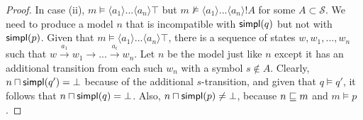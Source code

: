 \begin{proof}
In case (ii), $m \models \langle a_1 \rangle ... \langle a_n \rangle
\top$ but $m \nvDash \langle a_1 \rangle ... \langle a_n \rangle !A$
for some $A \subset \mathcal{S}$. We need to produce a model $n$ that
is incompatible with $\mathsf{simpl}(q)$ but not with $\mathsf{simpl}(p)$. Given that
$m \models \langle a_1 \rangle ... \langle a_n \rangle \top$, there is
a sequence of states $w, w_1, ..., w_n$ such that $w \xrightarrow{a_1}
w_1 \rightarrow ... \xrightarrow{a_i} w_n$. Let $n$ be the model just
like $n$ except it has an additional transition from each such $w_n$
with a symbol $s \notin A$. Clearly, $n \sqcap \mathsf{simpl}(q') = \bot$
because of the additional $s$-transition, and given that $q \models
q'$, it follows that $n \sqcap \mathsf{simpl}(q) = \bot$. Also, $n \sqcap
\mathsf{simpl}(p) \neq \bot$, because $n \sqsubseteq m$ and $m \models p$.


\end{proof}
